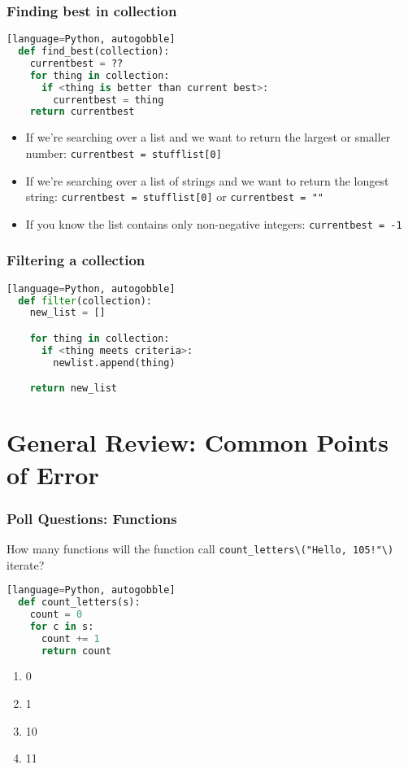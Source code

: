 \documentclass{beamer}
\begin{document}
%
%
\begin{frame}[fragile]
  \frametitle{Finding best in collection}
  \begin{lstlisting}[language=Python, autogobble][language=Python, autogobble]
  def find_best(collection):
    currentbest = ??
    for thing in collection:
      if <thing is better than current best>:
        currentbest = thing
    return currentbest 
  \end{lstlisting}
  \vfill
  \begin{itemize}
    \item If we're searching over a list and we want to return the largest or smaller number: \lstinline|currentbest = stufflist[0]| \pause
    \item If we're searching over a list of strings and we want to return the longest string: \lstinline|currentbest = stufflist[0]| or \lstinline|currentbest = ""| \pause
    \item If you know the list contains only non-negative integers: \lstinline|currentbest = -1|
  \end{itemize}
\end{frame}

%
%
\begin{frame}[fragile]
  \frametitle{Filtering a collection}
  \begin{lstlisting}[language=Python, autogobble][language=Python, autogobble]
  def filter(collection):
    new_list = []

    for thing in collection:
      if <thing meets criteria>:
        newlist.append(thing)

    return new_list
  \end{lstlisting}
\end{frame}

\section{General Review: Common Points of Error}

%
%
\begin{frame}[fragile]
  \frametitle{Poll Questions: Functions}
  How many functions will the function call \lstinline|count_letters\("Hello, 105!"\)| iterate?
  \begin{lstlisting}[language=Python, autogobble][language=Python, autogobble]
  def count_letters(s):
    count = 0
    for c in s:
      count += 1
      return count 
  \end{lstlisting}
  \vfill
  \begin{enumerate}[A]
    \item 0
    \item 1
    \item 10
    \item 11
  \end{enumerate}
\end{frame}
\end{document}
